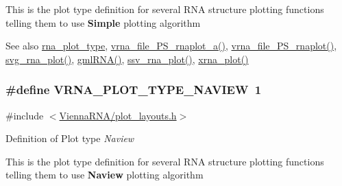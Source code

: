 This is the plot type definition for several R\+N\+A structure plotting functions telling them to use {\bfseries Simple} plotting algorithm

\begin{DoxySeeAlso}{See also}
\hyperlink{group__plotting__utils_ga5964c4581431b098b80027d6e14dcdd4}{rna\+\_\+plot\+\_\+type}, \hyperlink{group__plotting__utils_ga139a31dd0ba9fc6612431f67de901c31}{vrna\+\_\+file\+\_\+\+P\+S\+\_\+rnaplot\+\_\+a()}, \hyperlink{group__plotting__utils_gabdc8f6548ba4a3bc3cd868ccbcfdb86a}{vrna\+\_\+file\+\_\+\+P\+S\+\_\+rnaplot()}, \hyperlink{group__plotting__utils_gae7853539b5df98f294b4af434e979304}{svg\+\_\+rna\+\_\+plot()}, \hyperlink{group__plotting__utils_ga70834bc8c0aad4fe6824ff76ccb8f329}{gml\+R\+N\+A()}, \hyperlink{group__plotting__utils_gadd368528755f9a830727b680243541df}{ssv\+\_\+rna\+\_\+plot()}, \hyperlink{group__plotting__utils_ga2f6d5953e6a323df898896b8d6614483}{xrna\+\_\+plot()} 
\end{DoxySeeAlso}
\hypertarget{group__plotting__utils_ga94d4c863ecac2f220f76658afb92f964}{}
\subsubsection[{V\+R\+N\+A\+\_\+\+P\+L\+O\+T\+\_\+\+T\+Y\+P\+E\+\_\+\+N\+A\+V\+I\+E\+W}]{\setlength{\rightskip}{0pt plus 5cm}\#define V\+R\+N\+A\+\_\+\+P\+L\+O\+T\+\_\+\+T\+Y\+P\+E\+\_\+\+N\+A\+V\+I\+E\+W~1}\label{group__plotting__utils_ga94d4c863ecac2f220f76658afb92f964}


{\ttfamily \#include $<$\hyperlink{plot__layouts_8h}{Vienna\+R\+N\+A/plot\+\_\+layouts.\+h}$>$}



Definition of Plot type {\itshape Naview} 

This is the plot type definition for several R\+N\+A structure plotting functions telling them to use {\bfseries Naview} plotting algorithm

